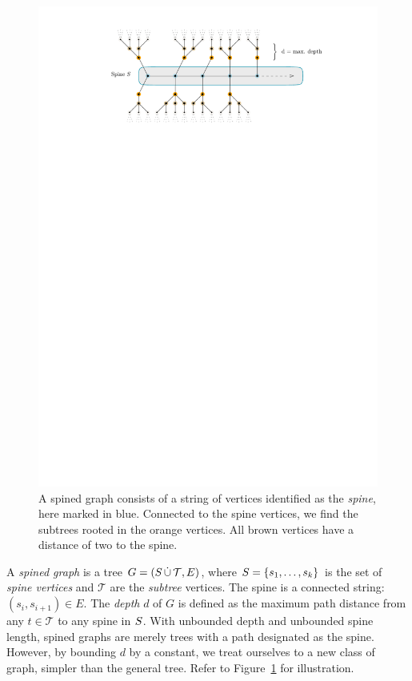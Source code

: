 \begin{figure}[t]
    \centering
    \includegraphics{graphics/ch2_spinedgraph.pdf}
    \caption[Spined graph]{A spined graph consists of a string of vertices identified as the \emph{spine}, here marked in blue. Connected to the spine vertices, we find the subtrees rooted in the orange vertices. All brown vertices have a distance of two to the spine.}
    \label{fig:ch2-spinedgraph}
\end{figure}

A \emph{spined graph} is a tree $G = (S \,\dot{\cup}\, \mathcal T, E)$, where $S = \{ s_1, \ldots, s_k \}$ is the set of \emph{spine vertices} and $\mathcal T$ are the \emph{subtree} vertices. The spine is a connected string: $(s_i, s_{i+1}) \in E$. The \emph{depth} $d$ of $G$ is defined as the maximum path distance from any $t \in \mathcal T$ to any spine in $S$. With unbounded depth and unbounded spine length, spined graphs are merely trees with a path designated as the spine. However, by bounding $d$ by a constant, we treat ourselves to a new class of graph, simpler than the general tree. Refer to Figure~\ref{fig:ch2-spinedgraph} for illustration.


